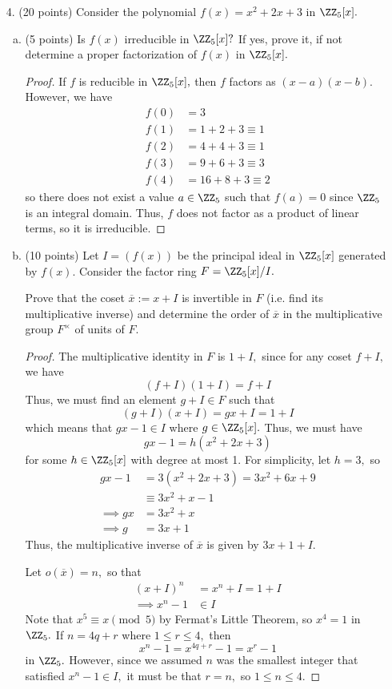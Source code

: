 \documentclass{article}
\begin{document}
\begin{itemize}
	\item[4.] (20 points) Consider the polynomial $f(x)=x^2+2x+3$ in $\ZZ_5[x].$
		\begin{enumerate}[(a)]
			\item (5 points) Is $f(x)$ irreducible in $\ZZ_5[x]?$ If yes, prove it, if not determine a proper factorization of $f(x)$ in $\ZZ_5[x].$
				\begin{proof}
					If $f$ is reducible in $\ZZ_5[x],$ then $f$ factors as $(x-a)(x-b).$ However, we have
					\begin{align*}
						f(0) &= 3 \\
						f(1) &= 1+2+3\equiv 1 \\
						f(2) &= 4+4+3\equiv 1 \\
						f(3) &= 9+6+3\equiv3 \\
						f(4) &= 16+8+3\equiv 2
					\end{align*}
					so there does not exist a value $a\in \ZZ_5$ such that $f(a)=0$ since $\ZZ_5$ is an integral domain. Thus, $f$ does not factor as a product of linear terms, so it is irreducible.
				\end{proof}

			\item (10 points) Let $I=(f(x))$ be the principal ideal in $\ZZ_5[x]$ generated by $f(x).$ Consider the factor ring $F=\ZZ_5[x]/I.$

				Prove that the coset $\overline{x}:=x+I$ is invertible in $F$ (i.e. find its multiplicative inverse) and determine the order of $\overline{x}$ in the multiplicative group $F^\times$ of units of $F.$
				\begin{proof}
					The multiplicative identity in $F$ is $1+I,$ since for any coset $f+I,$ we have 
					\[(f+I)(1+I)=f+I\]
					Thus, we must find an element $g+I\in F$ such that
					\[(g+I)(x+I)=gx+I=1+I\]
					which means that $gx-1\in I$ where $g\in \ZZ_5[x].$ Thus, we must have 
					\[gx-1=h(x^2+2x+3)\]
					for some $h\in \ZZ_5[x]$ with degree at most 1. For simplicity, let $h=3,$ so
					\begin{align*}
						gx-1 &= 3(x^2+2x+3) = 3x^2+6x+9 \\
						&\equiv 3x^2+x-1 \\
						\implies gx &= 3x^2+x \\
						\implies g&= 3x+1
					\end{align*}
					Thus, the multiplicative inverse of $\overline x$ is given by $3x+1+I.$

					Let $o(\overline x)=n,$ so that
					\begin{align*}
						(x+I)^n &= x^n+I = 1+I \\
						\implies x^n-1 &\in I
					\end{align*}
					Note that $x^5\equiv x\pmod 5$ by Fermat's Little Theorem, so $x^4=1$ in $\ZZ_5.$ If $n=4q+r$ where $1\le r\le 4,$ then \[x^n-1= x^{4q+r}-1=x^r-1\] in $\ZZ_5.$ However, since we assumed $n$ was the smallest integer that satisfied $x^n-1\in I,$ it must be that $r=n,$ so $1\le n\le4.$


\end{proof}
\end{enumerate}
\end{itemize}
\end{document}
